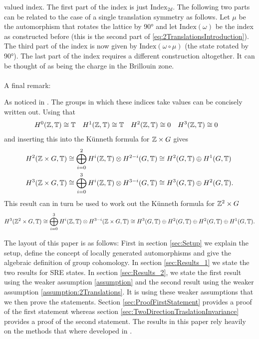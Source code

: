 \documentclass[11pt,a4paper,twoside]{article}
\numberwithin{equation}{section}
\begin{document}
valued index. The first part of the index is just $\textrm{Index}_{2d}$. The following two parts can be related to the case of a single translation symmetry as follows. Let $\mu$ be the automorphism that rotates the lattice by 90° and let $\textrm{Index}(\omega)$ be the index as constructed before (this is the second part of \ref{eq:2TranslationsIntroduction}). The third part of the index is now given by $\textrm{Index}(\omega\circ\mu)$ (the state rotated by 90°). The last part of the index requires a different construction altogether. It can be thought of as being the charge in the Brillouin zone.
\\\\
A final remark:
\begin{remark}
	As noticed in \cite{Chen_2013}. The groups in which these indices take values can be concisely written out. Using that
	\begin{align}
	H^0(\mathbb Z,\mathbb T)&\cong \mathbb T& H^1(\mathbb Z,\mathbb T)&\cong \mathbb T& H^2(\mathbb Z,\mathbb T)&\cong 0&H^3(\mathbb Z,\mathbb T)&\cong 0
	\end{align}
	and inserting this into the K\"unneth formula for $\mathbb Z\times G$ gives
	\begin{align}
	H^2(\mathbb Z \times G,\mathbb T)&\cong \bigoplus_{i=0}^2 H^i(\mathbb Z,\mathbb T)\otimes H^{2-i}(G,\mathbb T)\cong H^2(G,\mathbb T)\oplus H^1(G,\mathbb T)\\
	H^3(\mathbb Z \times G,\mathbb T)&\cong \bigoplus_{i=0}^3 H^i(\mathbb Z,\mathbb T)\otimes H^{3-i}(G,\mathbb T)\cong H^3(G,\mathbb T)\oplus H^2(G,\mathbb T).
	\end{align}
	This result can in turn be used to work out the K\"unneth formula for $\mathbb Z^2\times G$
	\begin{equation}
	H^3(\mathbb Z^2\times G,\mathbb T)\cong \bigoplus_{i=0}^3 H^i(\mathbb Z,\mathbb T)\otimes H^{3-i}(\mathbb Z\times G,\mathbb T)\cong H^3(G,\mathbb T)\oplus H^2(G,\mathbb T)\oplus H^2(G,\mathbb T)\oplus H^1(G,\mathbb T).
	\end{equation}
\end{remark}
The layout of this paper is as follows: First in section \ref{sec:Setup} we explain the setup, define the concept of locally generated automorphisms and give the algebraic definition of group cohomology. In section \ref{sec:Results_1} we state the two results for SRE states. In section \ref{sec:Results_2}, we state the first result using the weaker assumption \ref{assumption} and the second result using the weaker assumption \ref{assumption:2Translations}. It is using these weaker assumptions that we then prove the statements. Section \ref{sec:ProofFirstStatement} provides a proof of the first statement whereas section \ref{sec:TwoDirectionTraslationInvariance} provides a proof of the second statement. The results in this paper rely heavily on the methods that where developed in \cite{ogata2021h3gmathbb}.
\end{document}
